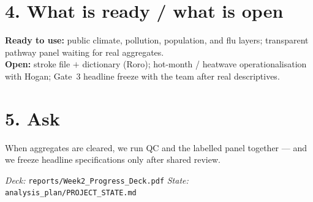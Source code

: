 \documentclass[11pt]{article}
\begin{document}
\section*{4. What is ready / what is open}
\textbf{Ready to use:} public climate, pollution, population, and flu layers; transparent pathway panel waiting for real aggregates.\\
\textbf{Open:} stroke file $+$ dictionary (Roro); hot-month / heatwave operationalisation with Hogan; Gate~3 headline freeze with the team after real descriptives.

\section*{5. Ask}
When aggregates are cleared, we run QC and the labelled panel together --- and we freeze headline specifications only after shared review.

\vspace{0.4em}
\noindent\textit{Deck:} \texttt{reports/Week2\_Progress\_Deck.pdf}
\quad\textit{State:} \texttt{analysis\_plan/PROJECT\_STATE.md}
\end{document}
